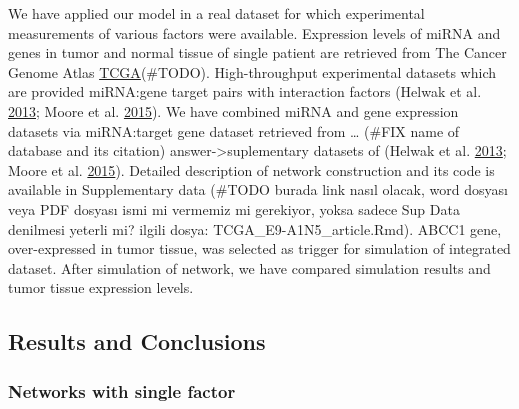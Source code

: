 \documentclass[]{article}
\begin{document}
We have applied our model in a real dataset for which experimental
measurements of various factors were available. Expression levels of
miRNA and genes in tumor and normal tissue of single patient are
retrieved from The Cancer Genome Atlas
\href{https://www.cancer.gov/about-nci/organization/ccg/research/structural-genomics/tcga}{TCGA}(\#TODO).
High-throughput experimental datasets which are provided miRNA:gene
target pairs with interaction factors (Helwak et al.
\protect\hyperlink{ref-helwak_mapping_2013}{2013}; Moore et al.
\protect\hyperlink{ref-moore_mirnatarget_2015}{2015}). We have combined
miRNA and gene expression datasets via miRNA:target gene dataset
retrieved from \ldots{} (\#FIX name of database and its citation)
answer-\textgreater{}suplementary datasets of (Helwak et al.
\protect\hyperlink{ref-helwak_mapping_2013}{2013}; Moore et al.
\protect\hyperlink{ref-moore_mirnatarget_2015}{2015}). Detailed
description of network construction and its code is available in
Supplementary data (\#TODO burada link nasıl olacak, word dosyası veya
PDF dosyası ismi mi vermemiz mi gerekiyor, yoksa sadece Sup Data
denilmesi yeterli mi? ilgili dosya: TCGA\_E9-A1N5\_article.Rmd). ABCC1
gene, over-expressed in tumor tissue, was selected as trigger for
simulation of integrated dataset. After simulation of network, we have
compared simulation results and tumor tissue expression levels.

\hypertarget{results-and-conclusions}{%
\subsection{Results and Conclusions}\label{results-and-conclusions}}

\hypertarget{networks-with-single-factor}{%
\subsubsection{Networks with single
factor}\label{networks-with-single-factor}}
\end{document}
